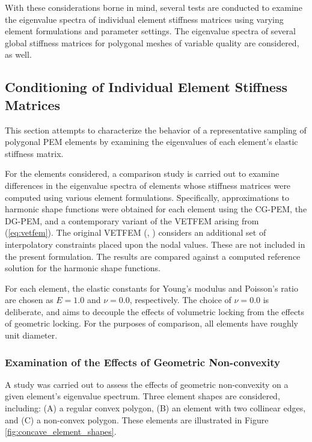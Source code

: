 With these considerations borne in mind, several tests are conducted to examine the eigenvalue spectra of individual element stiffness matrices using varying element formulations and parameter settings. The eigenvalue spectra of several global stiffness matrices for polygonal meshes of variable quality are considered, as well.

\subsection*{Conditioning of Individual Element Stiffness Matrices}

This section attempts to characterize the behavior of a representative sampling of polygonal PEM elements by examining the eigenvalues of each element's elastic stiffness matrix.

For the elements considered, a comparison study is carried out to examine differences in the eigenvalue spectra of elements whose stiffness matrices were computed using various element formulations. Specifically, approximations to harmonic shape functions were obtained for each element using the CG-PEM, the DG-PEM, and a contemporary variant of the VETFEM arising from (\ref{eq:vetfem}). The original VETFEM (\cite{Rashid:00}, \cite{Rashid:06}) considers an additional set of interpolatory constraints placed upon the nodal values. These are not included in the present formulation. The results are compared against a computed reference solution for the harmonic shape functions.

For each element, the elastic constants for Young's modulus and Poisson's ratio are chosen as $E = 1.0$ and $\nu = 0.0$, respectively. The choice of $\nu = 0.0$ is deliberate, and aims to decouple the effects of volumetric locking from the effects of geometric locking. For the purposes of comparison, all elements have roughly unit diameter.

\subsubsection*{Examination of the Effects of Geometric Non-convexity}

A study was carried out to assess the effects of geometric non-convexity on a given element's eigenvalue spectrum. Three element shapes are considered, including: (A) a regular convex polygon, (B) an element with two collinear edges, and (C) a non-convex polygon. These elements are illustrated in Figure \ref{fig:concave_element_shapes}.

